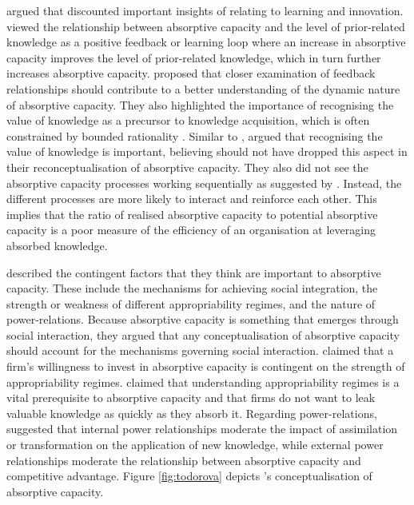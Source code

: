 \citet{todorova2007absorptive} argued that \citet{zahra2002absorptive} discounted important insights of \citet{cohen1990absorptive} relating to learning and innovation. \citet{cohen1990absorptive} viewed the relationship between absorptive capacity and the level of prior-related knowledge as a positive feedback or learning loop where an increase in absorptive capacity improves the level of prior-related knowledge, which in turn further increases absorptive capacity. \citet{todorova2007absorptive} proposed that closer examination of feedback relationships should contribute to a better understanding of the dynamic nature of absorptive capacity. They also highlighted the importance of recognising the value of knowledge as a precursor to knowledge acquisition, which is often constrained by bounded rationality \citep{simon1972theories,cohen1990absorptive,ocasio1997towards}. Similar to \citet{cohen1990absorptive}, \citet{todorova2007absorptive} argued that recognising the value of knowledge is important, believing \citet{zahra2002absorptive} should not have dropped this aspect in their reconceptualisation of absorptive capacity. They also did not see the absorptive capacity processes working sequentially as suggested by \citet{zahra2002absorptive}. Instead, the different processes are more likely to interact and reinforce each other. This implies that the ratio of realised absorptive capacity to potential absorptive capacity is a poor measure of the efficiency of an organisation at leveraging absorbed knowledge. \medskip

\citet{todorova2007absorptive} described the contingent factors that they think are important to absorptive capacity. These include the mechanisms for achieving social integration, the strength or weakness of different appropriability regimes, and the nature of power-relations. Because absorptive capacity is something that emerges through social interaction, they argued that any conceptualisation of absorptive capacity should account for the mechanisms governing social interaction. \citet{cohen1990absorptive} claimed that a firm's willingness to invest in absorptive capacity is contingent on the strength of appropriability regimes. \citet{todorova2007absorptive} claimed that understanding appropriability regimes is a vital prerequisite to absorptive capacity and that firms do not want to leak valuable knowledge as quickly as they absorb it. Regarding power-relations, \citet{todorova2007absorptive} suggested that internal power relationships moderate the impact of assimilation or transformation on the application of new knowledge, while external power relationships moderate the relationship between absorptive capacity and competitive advantage. Figure \ref{fig:todorova} depicts \citet{todorova2007absorptive}'s conceptualisation of absorptive capacity. \medskip

